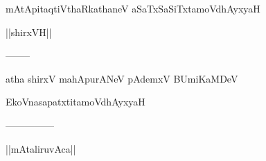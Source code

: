 \documentclass{article}
\begin{document}
\begin{center}
mAtApitaqtiVthaRkathaneV aSaTxSaSiTxtamoVdhAyxyaH
\end{center}

\begin{center}
||shirxVH||
\end{center}

\begin{center}
--------
\end{center}

\begin{center}
atha shirxV mahApurANeV pAdemxV BUmiKaMDeV
\end{center}

\begin{center}
EkoVnasapatxtitamoVdhAyxyaH
\end{center}

\begin{center}

---------------
\end{center}

\begin{center}
||mAtaliruvAca||
\end{center}
\end{document}
